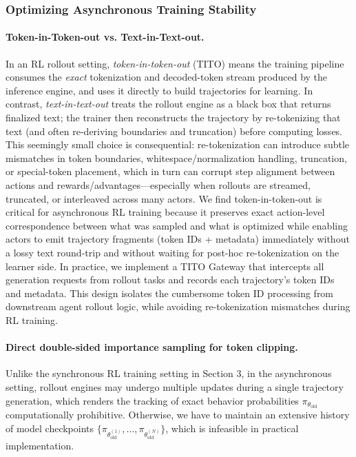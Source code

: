 \documentclass{article}
\theoremstyle{definition}
\begin{document}
\subsubsection{Optimizing Asynchronous Training Stability}
\paragraph{Token-in-Token-out vs. Text-in-Text-out.}
In an RL rollout setting, \emph{token-in-token-out} (TITO) means the training pipeline consumes the \emph{exact} tokenization and decoded-token stream produced by the inference engine, and uses it directly to build trajectories for learning. 
In contrast, \emph{text-in-text-out} treats the rollout engine as a black box that returns finalized text; the trainer then reconstructs the trajectory by re-tokenizing that text (and often re-deriving boundaries and truncation) before computing losses. 
This seemingly small choice is consequential: re-tokenization can introduce subtle mismatches in token boundaries, whitespace/normalization handling, truncation, or special-token placement, which in turn can corrupt step alignment between actions and rewards/advantages—especially when rollouts are streamed, truncated, or interleaved across many actors. 
We find token-in-token-out is critical for asynchronous RL training because it preserves exact action-level correspondence between what was sampled and what is optimized while enabling actors to emit trajectory fragments (token IDs + metadata) immediately without a lossy text round-trip and without waiting for post-hoc re-tokenization on the learner side.
In practice, we implement a TITO Gateway that intercepts all generation requests from rollout tasks and records each trajectory’s token IDs and metadata. 
This design isolates the cumbersome token ID processing from downstream agent rollout logic, while avoiding re-tokenization mismatches during RL training.

\paragraph{Direct
double-sided importance sampling for token clipping.}
Unlike the synchronous RL training setting in Section 3, in the asynchronous setting, rollout engines may undergo multiple updates during a single trajectory generation,
which renders the tracking of exact behavior probabilities $\pi_{\theta_{\text{old}}}$ computationally prohibitive. Otherwise, we have to maintain an extensive history of model checkpoints $\{\pi_{\theta_{\text{old}}^{(1)}}, \dots, \pi_{\theta_{\text{old}}^{(N)}}\}$, which is infeasible in practical implementation.
\end{document}
